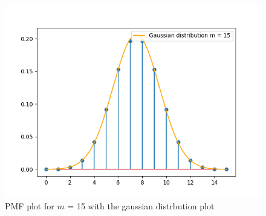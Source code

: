\documentclass[journal]{IEEEtran}
\begin{document}
\begin{figure}[h!]
  \centering
  \includegraphics[width=0.7\columnwidth]{figs/pmf2.png}
  \caption{PMF plot for $m$ = 15 with the gaussian distrbution plot}
  \label{label}
\end{figure}
\end{document}
